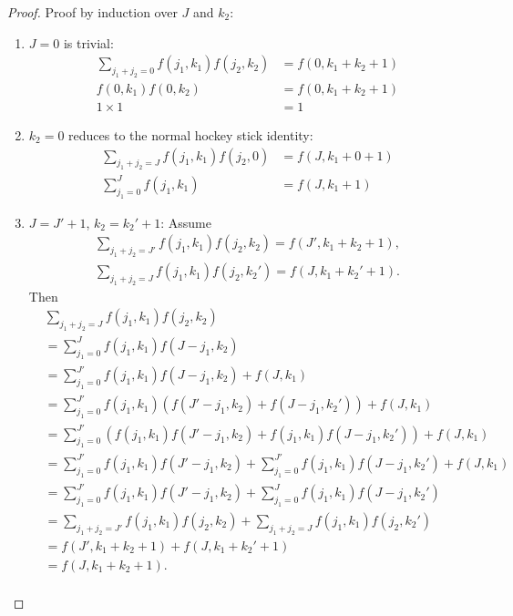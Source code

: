 \documentclass{article}
\begin{document}
\begin{proof}
Proof by induction over $J$ and $k_2$:
\begin{enumerate}
\item $J=0$ is trivial:
  \begin{align*}
    \sum_{j_1+j_2=0}f(j_1, k_1)f(j_2, k_2) &= f(0, k_1+k_2+1) \\
    f(0, k_1)f(0, k_2) &= f(0, k_1+k_2+1) \\
    1\times1 &= 1
  \end{align*}
\item $k_2=0$ reduces to the normal hockey stick identity:
  \begin{align*}
    \sum_{j_1+j_2=J}f(j_1, k_1)f(j_2, 0) &= f(J, k_1+0+1) \\
    \sum_{j_1=0}^{J}f(j_1, k_1) &= f(J, k_1+1)
  \end{align*}
\item $J=J'+1$, $k_2=k_2'+1$: Assume
  \begin{align*}
    \sum_{j_1+j_2=J'}f(j_1, k_1)f(j_2, k_2) = f(J', k_1+k_2+1), \\
    \sum_{j_1+j_2=J}f(j_1, k_1)f(j_2, k_2') = f(J, k_1+k_2'+1).
  \end{align*}
  Then
  \begin{align*}
    & \sum_{j_1+j_2=J}f(j_1, k_1)f(j_2, k_2) \\
    &= \sum_{j_1=0}^{J}f(j_1, k_1)f(J-j_1, k_2) \\
    &= \sum_{j_1=0}^{J'}f(j_1, k_1)f(J-j_1, k_2)+f(J, k_1) \\
    &= \sum_{j_1=0}^{J'}f(j_1, k_1)(f(J'-j_1, k_2)+f(J-j_1, k_2'))+f(J, k_1) \\
    &= \sum_{j_1=0}^{J'}(f(j_1, k_1)f(J'-j_1, k_2)+f(j_1, k_1)f(J-j_1, k_2'))+f(J, k_1) \\
    &= \sum_{j_1=0}^{J'}f(j_1, k_1)f(J'-j_1, k_2)+\sum_{j_1=0}^{J'}f(j_1, k_1)f(J-j_1, k_2')+f(J, k_1) \\
    &= \sum_{j_1=0}^{J'}f(j_1, k_1)f(J'-j_1, k_2)+\sum_{j_1=0}^{J}f(j_1, k_1)f(J-j_1, k_2') \\
    &= \sum_{j_1+j_2=J'}f(j_1, k_1)f(j_2, k_2)+\sum_{j_1+j_2=J}f(j_1, k_1)f(j_2, k_2') \\
    &= f(J', k_1+k_2+1)+f(J, k_1+k_2'+1) \\
    &= f(J, k_1+k_2+1). \\
  \end{align*}
\end{enumerate}

\end{proof}
\end{document}
